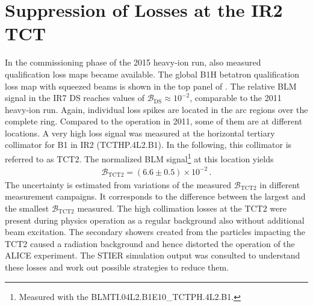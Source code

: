 \newpage

\section{Suppression of Losses at the IR2 TCT}\label{chap:ir2loss}


In the commissioning phase of the 2015 heavy-ion run, also measured qualification loss maps became available. The global B1H betatron qualification loss map with squeezed beams is shown in the top panel of . The relative BLM signal in the IR7 DS reaches values of $\mathcal{B}_\text{DS} \approx 10^{-2}$, comparable to the 2011 heavy-ion run. Again, individual loss spikes are located in the arc regions over the complete ring. Compared to the operation in 2011, some of them are at different locations. A very high loss signal was measured at the horizontal tertiary collimator for B1 in IR2 (TCTHP.4L2.B1). In the following, this collimator is referred to as TCT2. The normalized BLM signal\footnote{Measured with the BLMTI.04L2.B1E10\_TCTPH.4L2.B1.} at this location yields 
%
\begin{align}
  \mathcal{B}_\text{TCT2} = (6.6 \pm 0.5) \times 10^{-2} \, .
\end{align}
%
The uncertainty is estimated from variations of the measured $\mathcal{B}_\text{TCT2}$ in different measurement campaigns. It corresponds to the difference between the largest and the smallest $\mathcal{B}_\text{TCT2}$ measured.%
%
The high collimation losses at the TCT2 were present during physics operation as a regular background also without additional beam excitation. The secondary showers created from the particles impacting the TCT2 caused a radiation background and hence distorted the operation of the ALICE experiment. The STIER simulation output was consulted to understand these losses and work out possible strategies to reduce them.


